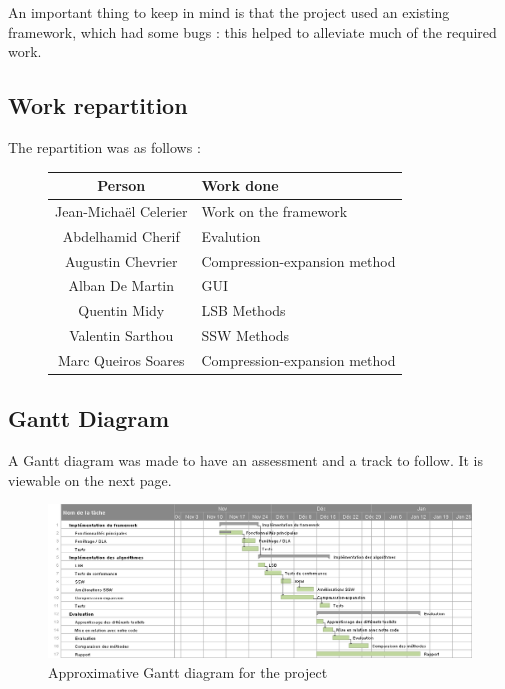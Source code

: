 An important thing to keep in mind is that the project used an existing framework, which had some bugs : this helped to alleviate much of the required work.

\subsection{Work repartition}
The repartition was as follows : 
\begin{figure}[h!]
\centering
\begin{tabular}{|c|l|}
\hline
Person & Work done \\
\hline
Jean-Michaël Celerier & Work on the framework \\
Abdelhamid Cherif & Evalution \\
Augustin Chevrier & Compression-expansion method \\
Alban De Martin & \ac{GUI} \\
Quentin Midy & \ac{LSB} Methods \\
Valentin Sarthou & \ac{SSW} Methods \\
Marc Queiros Soares & Compression-expansion method \\
\hline
\end{tabular}
\end{figure}

\subsection{Gantt Diagram}
A Gantt diagram was made to have an assessment and a track to follow. It is viewable on the next page.

\begin{figure}
\centering
\includegraphics[scale=0.65]{images/gantt.png}
\caption{Approximative Gantt diagram for the project}
\label{gantt}
\end{figure}
